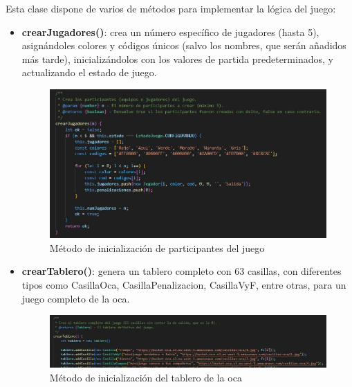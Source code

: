 Esta clase dispone de varios de métodos para implementar la lógica del juego:

\begin{itemize}
	\item \textbf{crearJugadores()}: crea un número específico de jugadores (hasta 5), asignándoles colores y códigos únicos (salvo los nombres, que serán añadidos más tarde), inicializándolos con los valores de partida predeterminados, y actualizando el estado de juego.
	\begin{figure}[H]
		\centering
		\includegraphics{imgs/codigo-oca-2.jpg}
		\caption{Método de inicialización de participantes del juego}
		\label{fig:codigo-oca-2}
	\end{figure}
	
	\item \textbf{crearTablero()}: genera un tablero completo con 63 casillas, con diferentes tipos como CasillaOca, CasillaPenalizacion, CasillaVyF, entre otras, para un juego completo de la oca.
	\begin{figure}[H]
		\centering
		\includegraphics[width=1\textwidth]{imgs/codigo-oca-3.jpg}
		\caption{Método de inicialización del tablero de la oca}
		\label{fig:codigo-oca-3}
	\end{figure}
	

\end{itemize}
